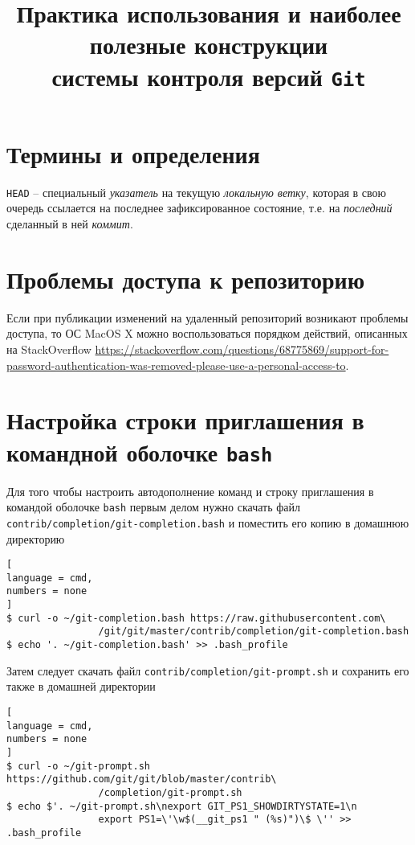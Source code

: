 \documentclass[%
	11pt,
	a4paper,
	utf8,
		]{article}
\begin{document}
\title{Практика использования и наиболее полезные конструкции\\системы контроля версий  \texttt{Git}}

\author{}

\date{}
\maketitle

\thispagestyle{fancy}

\tableofcontents


\section{Термины и определения}

\noindent\texttt{HEAD} -- специальный \textit{указатель} на текущую \emph{локальную ветку}, которая в свою очередь ссылается на последнее зафиксированное состояние, т.е. на \emph{последний} сделанный в ней \emph{коммит}. 

\section{Проблемы доступа к репозиторию}

Если при публикации изменений на удаленный репозиторий возникают проблемы доступа, то ОС MacOS X можно воспользоваться порядком действий, описанных на StackOverflow \url{https://stackoverflow.com/questions/68775869/support-for-password-authentication-was-removed-please-use-a-personal-access-to}.

\section{Настройка строки приглашения в командной оболочке \texttt{bash}}

Для того чтобы настроить автодополнение команд и строку приглашения в командой оболочке \texttt{bash} первым делом нужно скачать файл \texttt{contrib/completion/git-completion.bash} и поместить его копию в домашнюю директорию
\begin{lstlisting}[
language = cmd,
numbers = none
]
$ curl -o ~/git-completion.bash https://raw.githubusercontent.com\
                /git/git/master/contrib/completion/git-completion.bash
$ echo '. ~/git-completion.bash' >> .bash_profile
\end{lstlisting}

Затем следует скачать файл \texttt{contrib/completion/git-prompt.sh} и сохранить его также в домашней директории
\begin{lstlisting}[
language = cmd,
numbers = none
]
$ curl -o ~/git-prompt.sh https://github.com/git/git/blob/master/contrib\
                /completion/git-prompt.sh
$ echo $'. ~/git-prompt.sh\nexport GIT_PS1_SHOWDIRTYSTATE=1\n
                export PS1=\'\w$(__git_ps1 " (%s)")\$ \'' >> .bash_profile
\end{lstlisting}
\end{document}
